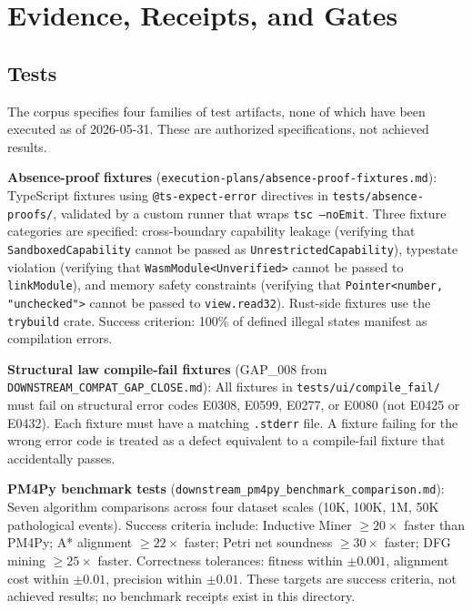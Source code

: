 
\section{Evidence, Receipts, and Gates}
\label{sec:prompts-evidence}

\subsection{Tests}
\label{sec:prompts-evidence-tests}

The corpus specifies four families of test artifacts, none of which have been
executed as of 2026-05-31. These are authorized specifications, not achieved results.

\textbf{Absence-proof fixtures} (\texttt{execution-plans/absence-proof-fixtures.md}):
TypeScript fixtures using \texttt{@ts-expect-error} directives in
\texttt{tests/absence-proofs/}, validated by a custom runner that wraps
\texttt{tsc --noEmit}. Three fixture categories are specified: cross-boundary
capability leakage (verifying that \texttt{SandboxedCapability} cannot be passed as
\texttt{UnrestrictedCapability}), typestate violation (verifying that
\texttt{WasmModule<Unverified>} cannot be passed to \texttt{linkModule}), and memory
safety constraints (verifying that \texttt{Pointer<number, "unchecked">} cannot be
passed to \texttt{view.read32}). Rust-side fixtures use the \texttt{trybuild} crate.
Success criterion: 100\% of defined illegal states manifest as compilation errors.

\textbf{Structural law compile-fail fixtures} (GAP\_008 from
\texttt{DOWNSTREAM\_COMPAT\_GAP\_CLOSE.md}): All fixtures in
\texttt{tests/ui/compile\_fail/} must fail on structural error codes E0308, E0599,
E0277, or E0080 (not E0425 or E0432). Each fixture must have a matching
\texttt{.stderr} file. A fixture failing for the wrong error code is treated as a
defect equivalent to a compile-fail fixture that accidentally passes.

\textbf{PM4Py benchmark tests} (\texttt{downstream\_pm4py\_benchmark\_comparison.md}):
Seven algorithm comparisons across four dataset scales (10K, 100K, 1M, 50K
pathological events). Success criteria include: Inductive Miner $\geq 20\times$
faster than PM4Py; A* alignment $\geq 22\times$ faster; Petri net soundness
$\geq 30\times$ faster; DFG mining $\geq 25\times$ faster. Correctness tolerances:
fitness within $\pm0.001$, alignment cost within $\pm0.01$, precision within $\pm0.01$.
These targets are success criteria, not achieved results; no benchmark receipts exist
in this directory.

